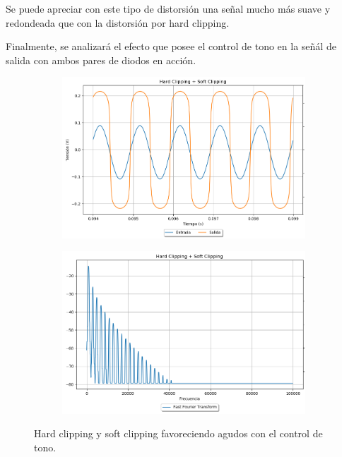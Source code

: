 Se puede apreciar con este tipo de distorsión una señal mucho más suave y redondeada que con la distorsión por hard clipping.

Finalmente, se analizará el efecto que posee el control de tono en la señál de salida con ambos pares de diodos en acción.

\begin{figure}[H]
\hspace{-7.5em}
	\begin{subfigure}{0.5\textwidth}
		\includegraphics[width=1.5\textwidth, trim={0 0 0 0}, clip]{Ejercicio5/Imagenes/Propuesto/Mediciones/hard_soft1.png}
		\label{fig:prop_alone3}
	\end{subfigure}
	\hspace{6em}
	\begin{subfigure}{0.5\textwidth}
		\includegraphics[width=1.5\textwidth, trim={0 0 0 0}, clip]{Ejercicio5/Imagenes/Propuesto/Mediciones/hard_softfft1.png}
		\centering
		\label{fig:prop_alone3fft}
	\end{subfigure}
	\caption{Hard clipping y soft clipping favoreciendo agudos con el control de tono.}
\end{figure}

